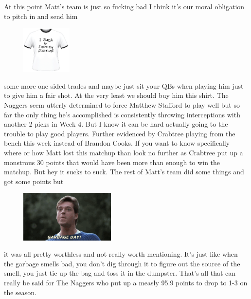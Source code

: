 \documentclass[11pt,letterpaper]{article}
\begin{document}
\newpage
{}
\par\noindent At this point Matt's team is just so fucking bad I think it's our moral obligation to pitch in and send him \begin{figure}
\centering
\includegraphics[width=0.225\textwidth]{week4-suck.png}
\label{fig:week4-suck}
\vspace{-20pt}
\end{figure} 
\par\noindent some more one sided trades and maybe just sit your QBs when playing him just to give him a fair shot. At the very least we should buy him this shirt. The Naggers seem utterly determined to force Matthew Stafford to play well but so far the only thing he's accomplished is consistently throwing interceptions with another 2 picks in Week 4. But I know it can be hard actually going to the trouble to play good players. Further evidenced by Crabtree playing from the bench this week instead of Brandon Cooks. If you want to know specifically where or how Matt lost this matchup than look no further as Crabtree put up a monstrous 30 points that would have been more than enough to win the matchup. But hey it sucks to suck. The rest of Matt's team did some things and got some points but 
\begin{figure}
\centering
\includegraphics[width=0.425\textwidth]{week4-garbage.png}
\label{fig:week4-garbage}
\end{figure} 
\par\noindent it was all pretty worthless and not really worth mentioning. It's just like when the garbage smells bad, you don't dig through it to figure out the source of the smell, you just tie up the bag and toss it in the dumpster. That's all that can really be said for The Naggers who put up a measly 95.9 points to drop to 1-3 on the season. 
\end{document}
